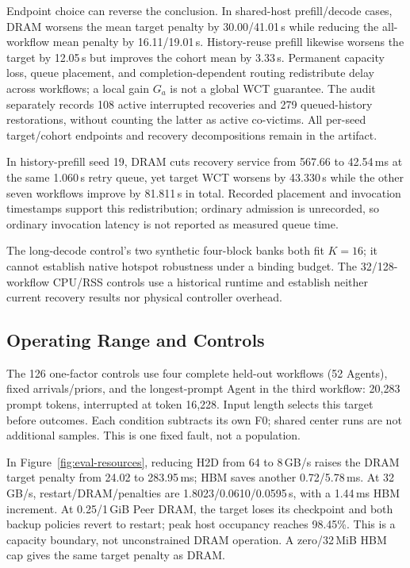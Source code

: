 Endpoint choice can reverse the conclusion. In shared-host prefill/decode
cases, DRAM worsens the mean target penalty by 30.00/41.01\,s while reducing
the all-workflow mean penalty by 16.11/19.01\,s. History-reuse prefill likewise
worsens the target by 12.05\,s but improves the cohort mean by 3.33\,s.
Permanent capacity loss, queue placement, and completion-dependent routing
redistribute delay across workflows; a local gain $G_a$ is not a global WCT
guarantee. The audit separately records 108 active interrupted recoveries and
279 queued-history restorations, without counting the latter as active
co-victims. All per-seed target/cohort endpoints and recovery decompositions
remain in the artifact.

In history-prefill seed 19, DRAM cuts recovery service from 567.66 to
42.54\,ms at the same 1.060\,s retry queue, yet target WCT worsens by
43.330\,s while the other seven workflows improve by 81.811\,s in total.
Recorded placement and invocation timestamps support this redistribution;
ordinary admission is unrecorded, so ordinary invocation latency is not
reported as measured queue time.

The long-decode control's two synthetic four-block banks both fit $K=16$;
it cannot establish native hotspot robustness under a binding budget.
The 32/128-workflow CPU/RSS controls use a historical runtime and establish
neither current recovery results nor physical controller overhead.

\subsection{Operating Range and Controls}
\label{sec:eval-sensitivity}
The 126 one-factor controls use four complete held-out workflows (52 Agents),
fixed arrivals/priors, and the longest-prompt Agent in the third workflow:
20,283 prompt tokens, interrupted at token 16,228. Input length selects this
target before outcomes. Each condition subtracts its own F0; shared center
runs are not additional samples. This is one fixed fault, not a population.

In Figure~\ref{fig:eval-resources}, reducing H2D from 64 to 8\,GB/s raises the
DRAM target penalty from 24.02 to 283.95\,ms; HBM saves another 0.72/5.78\,ms.
At 32\,GB/s, restart/DRAM/\system penalties are 1.8023/0.0610/0.0595\,s,
with a 1.44\,ms HBM increment. At 0.25/1\,GiB Peer DRAM, the target loses its
checkpoint and both backup policies revert to restart; peak host occupancy
reaches 98.45\%. This is a capacity boundary, not unconstrained DRAM operation.
A zero/32\,MiB HBM cap gives the same target penalty as DRAM.

